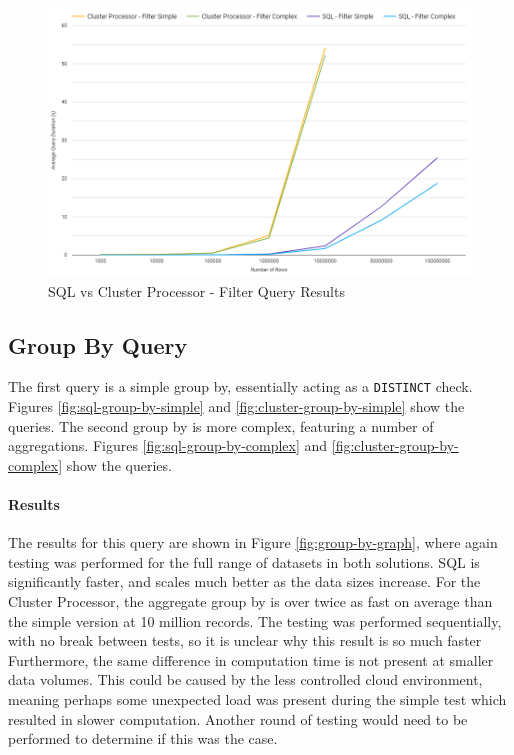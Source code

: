 \begin{figure}[h]
	\centering
	\includegraphics[width=0.8\linewidth]{chapters/diagrams/testing/filter-1k-100m}
	\caption{SQL vs Cluster Processor - Filter Query Results}
	\label{fig:filter-graph}
\end{figure}


\subsection{Group By Query}
The first query is a simple group by, essentially acting as a \texttt{DISTINCT} check. Figures \ref{fig:sql-group-by-simple} and \ref{fig:cluster-group-by-simple} show the queries. The second group by is more complex, featuring a number of aggregations. Figures \ref{fig:sql-group-by-complex} and \ref{fig:cluster-group-by-complex} show the queries. 

\paragraph{Results}
The results for this query are shown in Figure \ref{fig:group-by-graph}, where again testing was performed for the full range of datasets in both solutions. SQL is significantly faster, and scales much better as the data sizes increase. For the Cluster Processor, the aggregate group by is over twice as fast on average than the simple version at 10 million records. The testing was performed sequentially, with no break between tests, so it is unclear why this result is so much faster Furthermore, the same difference in computation time is not present at smaller data volumes. This could be caused by the less controlled cloud environment, meaning perhaps some unexpected load was present during the simple test which resulted in slower computation. Another round of testing would need to be performed to determine if this was the case.

